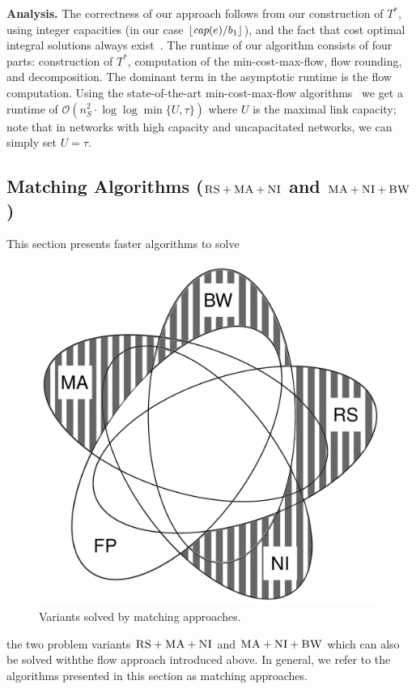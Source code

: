 \documentclass[conference,10pt]{IEEEtran}
\newcommand{\capacity}{\emph{cap}}
\newcommand{\CC}{\textsc{NI}}
\newcommand{\RS}{\textsc{RS}}
\newcommand{\BW}{\textsc{BW}}
\newcommand{\MA}{\textsc{MA}}
\newcommand{\Tree}{\ensuremath{T}}
\newcommand{\CostTrans}{\ensuremath{b_1}}
\begin{document}
\textbf{Analysis.}
The correctness of our approach follows from our construction
of $\Tree^*$, using integer capacities (in our case $\lfloor\capacity(e)/\CostTrans\rfloor$),
and the fact that cost optimal integral solutions always exist~\cite{flow-book}.
The runtime of our algorithm consists of four parts: construction of $\Tree^*$,
computation of the min-cost-max-flow, flow rounding, and decomposition. The
dominant term in the asymptotic runtime is the flow computation.
Using the state-of-the-art min-cost-max-flow
algorithms~\cite{mincostmaxflow-1,mincostmaxflow-2}
we get a runtime of $\mathcal{O}(n_S^2 \cdot \log\log \min \{U,\tau\})$
where $U$ is the maximal link capacity; note that in networks with high capacity
and uncapacitated networks, we can simply set $U=\tau$.


\subsection{Matching Algorithms ($\RS+\MA+\CC$ and $\MA+\CC+\BW$)}\label{ssec:match}



This section presents faster algorithms to solve 
\begin{figure}
\vspace{-1em}
\includegraphics[width=0.48\columnwidth]{figs/venn_matching.pdf}
\caption{Variants solved by matching approaches.}
\vspace{-1em}
\label{fig:venn_match}
\end{figure}
the two problem variants
$\RS+\MA+\CC$ and $\MA+\CC+\BW$ which can also be solved withthe flow approach
introduced above.
In general, we refer to the algorithms presented in this section
as matching approaches.
\end{document}
